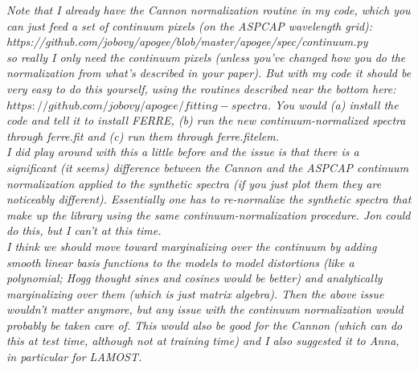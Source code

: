 \documentclass[11pt]{amsart}
\begin{document}
\textit{Note that I already have the Cannon normalization routine in my code, which you can just feed a set of continuum pixels (on the ASPCAP wavelength grid):}\\

\textit{ https://github.com/jobovy/apogee/blob/master/apogee/spec/continuum.py}\\

\textit{ so really I only need the continuum pixels (unless you've changed how you do the normalization from what's described in your paper). But with my code it should be very easy to do this yourself, using the routines described near the bottom here: {$https://github.com/jobovy/apogee/fitting-spectra$}. You would (a) install the code and tell it to install FERRE, (b) run the new continuum-normalized spectra through ferre.fit and (c) run them through ferre.fitelem.}\\

\textit{I did play around with this a little before and the issue is that there is a significant (it seems) difference between the Cannon and the ASPCAP continuum normalization applied to the synthetic spectra (if you just plot them they are noticeably different). Essentially one has to re-normalize the synthetic spectra that make up the library using the same continuum-normalization procedure. Jon could do this, but I can't at this time.}\\

\textit{I think we should move toward marginalizing over the continuum by adding smooth linear basis functions to the models to model distortions (like a polynomial; Hogg thought sines and cosines would be better) and analytically marginalizing over them (which is just matrix algebra). Then the above issue wouldn't matter anymore, but any issue with the continuum normalization would probably be taken care of. This would also be good for the Cannon (which can do this at test time, although not at training time) and I also suggested it to Anna, in particular for LAMOST.}\\

\end{document}
